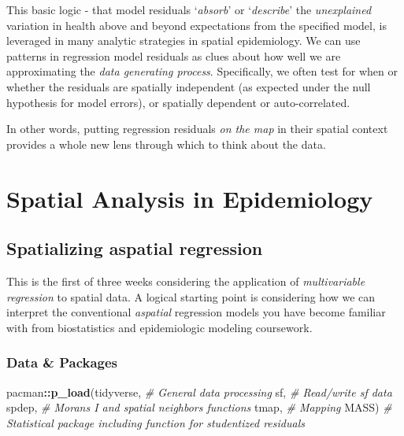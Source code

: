 \documentclass[
]{book}
\newenvironment{Shaded}{\begin{snugshade}}{\end{snugshade}}
\newcommand{\CommentTok}[1]{\textcolor[rgb]{0.56,0.35,0.01}{\textit{#1}}}
\newcommand{\FunctionTok}[1]{\textcolor[rgb]{0.13,0.29,0.53}{\textbf{#1}}}
\newcommand{\NormalTok}[1]{#1}
\newcommand{\SpecialCharTok}[1]{\textcolor[rgb]{0.81,0.36,0.00}{\textbf{#1}}}
\begin{document}
This basic logic - that model residuals `\emph{absorb}' or `\emph{describe}' the \emph{unexplained} variation in health above and beyond expectations from the specified model, is leveraged in many analytic strategies in spatial epidemiology. We can use patterns in regression model residuals as clues about how well we are approximating the \emph{data generating process}. Specifically, we often test for when or whether the residuals are spatially independent (as expected under the null hypothesis for model errors), or spatially dependent or auto-correlated.

In other words, putting regression residuals \emph{on the map} in their spatial context provides a whole new lens through which to think about the data.

\hypertarget{spatial-analysis-in-epidemiology-6}{%
\section{Spatial Analysis in Epidemiology}\label{spatial-analysis-in-epidemiology-6}}

\hypertarget{spatializing-aspatial-regression}{%
\subsection{Spatializing aspatial regression}\label{spatializing-aspatial-regression}}

This is the first of three weeks considering the application of \emph{multivariable regression} to spatial data. A logical starting point is considering how we can interpret the conventional \emph{aspatial} regression models you have become familiar with from biostatistics and epidemiologic modeling coursework.

\hypertarget{data-packages}{%
\subsubsection{Data \& Packages}\label{data-packages}}

\begin{Shaded}
\begin{Highlighting}[]
\NormalTok{pacman}\SpecialCharTok{::}\FunctionTok{p\_load}\NormalTok{(tidyverse, }\CommentTok{\# General data processing}
\NormalTok{               sf,        }\CommentTok{\# Read/write sf data}
\NormalTok{               spdep,     }\CommentTok{\# Moran\textquotesingle{}s I and spatial neighbors functions}
\NormalTok{               tmap,      }\CommentTok{\# Mapping}
\NormalTok{               MASS)      }\CommentTok{\# Statistical package including function for studentized residuals}
\end{Highlighting}
\end{Shaded}
\end{document}
